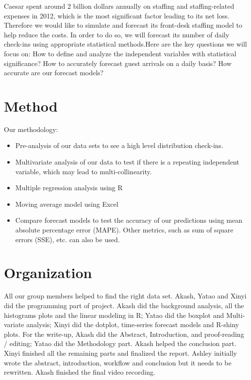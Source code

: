 \documentclass{article}
\begin{document}
Caesar spent around 2 billion dollars annually on staffing and staffing-related expenses in 2012, which is the most significant factor leading to its net loss. Therefore we would like to simulate and forecast its front-desk staffing model to help reduce the costs. In order to do so, we will forecast its number of daily check-ins using appropriate statistical methods.Here are the key questions we will focus on:
How to define and analyze the independent variables with statistical significance? 
How to accurately forecast guest arrivals on a daily basis?
How accurate are our forecast models?


\section{Method}
Our methodology: 
\begin{itemize}
  \item  Pre-analysis of our data sets to see a high level distribution check-ins.
  \item Multivariate analysis of our data to test if there is a repeating independent variable, which may lead to multi-collinearity. 
  \item Multiple regression analysis using R
  \item Moving average model using Excel
  \item Compare forecast models to test the accuracy of our predictions using mean absolute percentage error (MAPE). Other metrics, such as sum of square errors (SSE), etc. can also be used.
\end{itemize} 

\section{Organization}

All our group members helped to find the right data set. Akash, Yatao and Xinyi did the programming part of project. Akash did the background analysis, all the histograms plots and the linear modeling in R; Yatao did the boxplot and Multi-variate analysis; Xinyi did the dotplot, time-series forecast models and R-shiny plots. For the write-up, Akash did the Abstract, Introduction, and proof-reading / editing; Yatao did the Methodology part. Akash helped the conclusion part. Xinyi finished all the remaining parts and finalized the report. Ashley initially wrote the abstract, introduction, workflow and conclusion but it needs to be rewritten. Akash finished the final video recording. 
 
\end{document}
